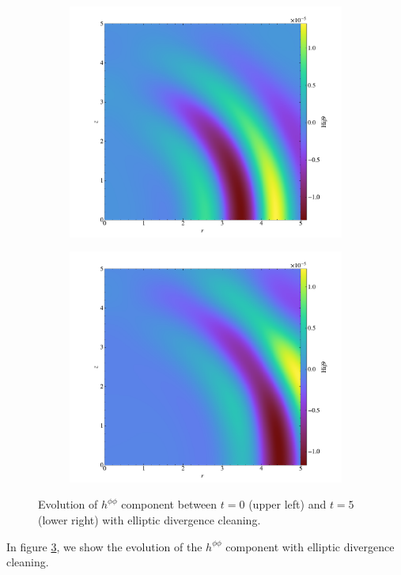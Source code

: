 \begin{figure}[h!]
\begin{subfigure}{.5\textwidth}
  \centering
  \includegraphics[width=\linewidth]{result_hij_0040.pdf}
  \label{fig:hij9_4}
\end{subfigure}%
\begin{subfigure}{.5\textwidth}
  \centering
  \includegraphics[width=\linewidth]{result_hij_0050.pdf}
  \label{fig:hij9_5}
\end{subfigure}%

\caption{Evolution of $h^{\phi\phi}$ component between $t=0$ (upper left) and $t=5$ (lower right) with elliptic divergence cleaning.}
\label{fig:hij9}
\end{figure}
In figure \ref{fig:hij9}, we show the evolution of the $h^{\phi\phi}$ component with elliptic divergence cleaning.

